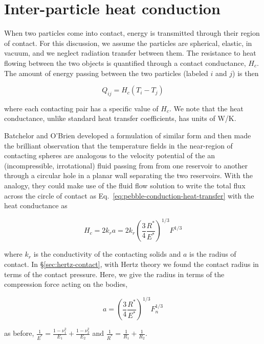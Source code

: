 \section{Inter-particle heat conduction}\label{sec:ht-pebble-conduction}

When two particles come into contact, energy is transmitted through their region of contact. For this discussion, we assume the particles are spherical, elastic, in vacuum, and we neglect radiation transfer between them. The resistance to heat flowing between the two objects is quantified through a contact conductance, $H_c$. The amount of energy passing between the two particles (labeled $i$ and $j$) is then

\begin{equation}\label{eq:pebble-conduction-heat-transfer}
	Q_{ij} = H_{c}(T_i - T_j)
\end{equation}

where each contacting pair has a specific value of $H_c$. We note that the heat conductance, unlike standard heat transfer coefficients, has units of \si{W/K}.

Batchelor and O'Brien\cite{Batchelor1977} developed a formulation of similar form and then made the brilliant observation that the temperature fields in the near-region of contacting spheres are analogous to the velocity potential of the an (incompressible, irrotational) fluid passing from from one reservoir to another through a circular hole in a planar wall separating the two reservoirs. With the analogy, they could make use of the fluid flow solution to write the total flux across the circle of contact as Eq.~\ref{eq:pebble-conduction-heat-transfer} with the heat conductance as

\begin{equation}\label{eq:batchelor-pebble-conductance}
	H_c = 2k_ra = 2k_r \left(\frac{3}{4}\frac{R^*}{E^*}\right)^{1/3}F^{1/3}
\end{equation}

where $k_r$ is the conductivity of the contacting solids and $a$ is the radius of contact. In \S\ref{sec:hertz-contact}, with Hertz theory we found the contact radius in terms of the contact pressure. Here, we give the radius in terms of the compression force acting on the bodies,

\begin{equation}
	a =  \left(\frac{3}{4}\frac{R^*}{E^*}\right)^{1/3}F_n^{1/3}	
\end{equation}

as before, $\frac{1}{E^*} = \frac{1-\nu_1^2}{E_1} + \frac{1-\nu_2^2}{E_2}$ and $\frac{1}{R^*} = \frac{1}{R_1} + \frac{1}{R_2}$. 

